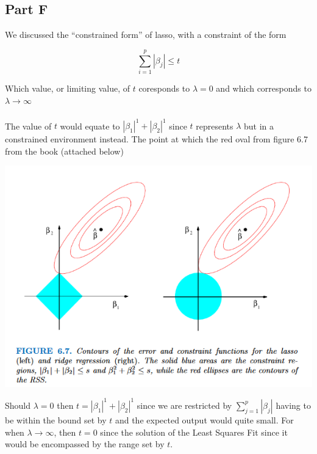 \documentclass[12pt]{article}
\begin{document}
\subsection{Part F}
We discussed the “constrained form” of lasso, with a constraint of the form
\begin{center}
    \[\sum_{i=1}^{p}|\beta_j| \leq t\]
\end{center}
Which value, or limiting value, of $t$ coresponds to $\lambda = 0$ and which corresponds to $\lambda \rightarrow \infty$\\\\
The value of $t$ would equate to $|\beta_1|^1 + |\beta_2|^1$ since $t$ represents $\lambda$ but in a constrained environment instead. The point at which the red oval from figure 6.7 from the book (attached below)
\begin{center}\includegraphics{p1.f.png}\end{center}
Should $\lambda = 0$ then $t = |\beta_1|^1 + |\beta_2|^1$ since we are restricted by $\sum_{j=1}^p |\beta_j|$ having to be within the bound set by $t$ and the expected output would quite small. For when $\lambda\rightarrow\infty$, then $t = 0$ since the solution of the Least Squares Fit since it would be encompassed by the range set by $t$.



\pagebreak
\end{document}
